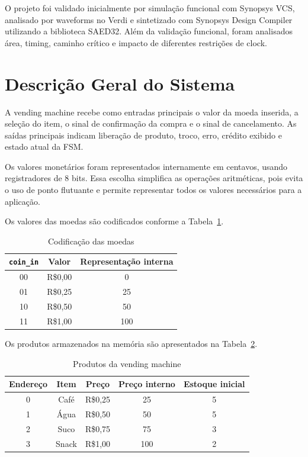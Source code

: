 \documentclass[11pt,a4paper]{article}
\begin{document}
O projeto foi validado inicialmente por simulação funcional com Synopsys VCS, analisado por waveforms no Verdi e sintetizado com Synopsys Design Compiler utilizando a biblioteca SAED32. Além da validação funcional, foram analisados área, timing, caminho crítico e impacto de diferentes restrições de clock.

\section{Descrição Geral do Sistema}

A vending machine recebe como entradas principais o valor da moeda inserida, a seleção do item, o sinal de confirmação da compra e o sinal de cancelamento. As saídas principais indicam liberação de produto, troco, erro, crédito exibido e estado atual da FSM.

Os valores monetários foram representados internamente em centavos, usando registradores de 8 bits. Essa escolha simplifica as operações aritméticas, pois evita o uso de ponto flutuante e permite representar todos os valores necessários para a aplicação.

Os valores das moedas são codificados conforme a Tabela~\ref{tab:moedas}.

\begin{table}[H]
\centering
\caption{Codificação das moedas}
\label{tab:moedas}
\begin{tabular}{ccc}
\toprule
\textbf{\texttt{coin\_in}} & \textbf{Valor} & \textbf{Representação interna} \\
\midrule
00 & R\$0,00 & 0 \\
01 & R\$0,25 & 25 \\
10 & R\$0,50 & 50 \\
11 & R\$1,00 & 100 \\
\bottomrule
\end{tabular}
\end{table}

Os produtos armazenados na memória são apresentados na Tabela~\ref{tab:produtos}.

\begin{table}[H]
\centering
\caption{Produtos da vending machine}
\label{tab:produtos}
\begin{tabular}{ccccc}
\toprule
\textbf{Endereço} & \textbf{Item} & \textbf{Preço} & \textbf{Preço interno} & \textbf{Estoque inicial} \\
\midrule
0 & Café  & R\$0,25 & 25  & 5 \\
1 & Água  & R\$0,50 & 50  & 5 \\
2 & Suco  & R\$0,75 & 75  & 3 \\
3 & Snack & R\$1,00 & 100 & 2 \\
\bottomrule
\end{tabular}
\end{table}
\end{document}
